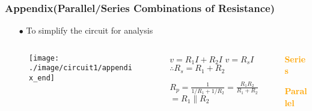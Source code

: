 \documentclass{beamer}
\newcommand{\orange}[1]{\textcolor{orange}{#1}}
\begin{document}
\begin{frame}
\frametitle{Appendix(Parallel/Series Combinations of Resistance)}
\begin{itemize} \itemsep1pt \parskip0pt 
  	\item[$\bullet$] To simplify the circuit for analysis
\end{itemize}
\begin{columns}
\begin{column}{6cm}
\begin{figure}[H]
  \centering
  \texttt{[image: ./image/circuit1/appendix\_end]}
\end{figure}
\end{column}

\begin{column}{4cm}
\vspace{8 mm} \newline
$v = R_1I + R_2I$ \newline
$v = R_sI$ \newline
$\therefore R_s = R_1 + R_2$ \newline

\vspace{10 mm}
$R_p = \frac{1}{1/R_1+1/R_2} =\frac{R_1R_2}{R_1+R_2}$ \newline\newline
$ = R_1 \parallel R_2$

\end{column}

\begin{column}{2cm}
\bf{\orange{Series}} \newline\newline\newline\newline\newline

\bf{\orange{Parallel}}
\end{column}
\end{columns}

\end{frame}
\end{document}
